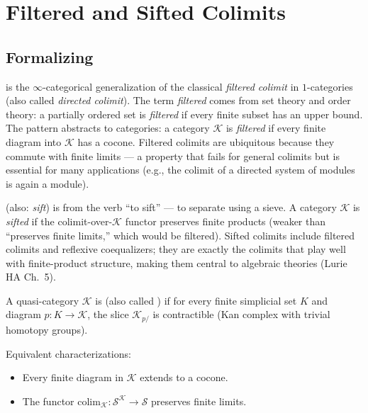 \section{Filtered and Sifted Colimits}
\label{sec:filtered-sifted}

\subsection{Formalizing}

\begin{nameorigin}
 is the $\infty$-categorical generalization of
the classical \emph{filtered colimit} in $1$-categories (also called
\emph{directed colimit}). The term \emph{filtered} comes from set
theory and order theory: a partially ordered set is \emph{filtered} if
every finite subset has an upper bound. The pattern abstracts to
categories: a category $\mathcal{K}$ is \emph{filtered} if every finite
diagram into $\mathcal{K}$ has a cocone. Filtered colimits are
ubiquitous because they commute with finite limits — a property that
fails for general colimits but is essential for many applications
(e.g., the colimit of a directed system of modules is again a module).
\end{nameorigin}

\begin{nameorigin}
 (also: \emph{sift}) is from the verb ``to sift'' — to
separate using a sieve. A category $\mathcal{K}$ is \emph{sifted} if
the colimit-over-$\mathcal{K}$ functor preserves finite products
(weaker than ``preserves finite limits,'' which would be filtered).
Sifted colimits include filtered colimits and reflexive coequalizers;
they are exactly the colimits that play well with finite-product
structure, making them central to algebraic theories (Lurie HA Ch.~5).
\end{nameorigin}

\begin{definition}
\label{def:filtered-qcat}
A quasi-category $\mathcal{K}$ is  (also called
) if for every finite simplicial set $K$ and
diagram $p : K \to \mathcal{K}$, the slice $\mathcal{K}_{p/}$ is
contractible (Kan complex with trivial homotopy groups).

Equivalent characterizations:
\begin{itemize}
  \item Every finite diagram in $\mathcal{K}$ extends to a cocone.
  \item The functor $\mathrm{colim}_\mathcal{K} : \mathcal{S}^\mathcal{K}
        \to \mathcal{S}$ preserves finite limits.
\end{itemize}
\end{definition}

